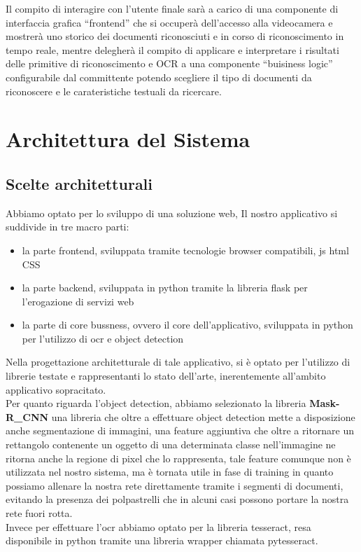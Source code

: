 \documentclass[12pt,a4paper]{article}
\newcommand{\mrcnn}{Mask-R\_CNN}
\begin{document}
Il compito di interagire con l'utente finale sarà a carico di una
componente di interfaccia grafica ``frontend'' che si occuperà
dell'accesso alla videocamera e mostrerà uno storico dei documenti
riconosciuti e in corso di riconoscimento in tempo reale, mentre
delegherà il compito di applicare e interpretare i risultati delle
primitive di riconoscimento e OCR a una componente ``buisiness logic''
configurabile dal committente potendo scegliere il tipo di documenti da
riconoscere e le carateristiche testuali da ricercare.

\section{Architettura del Sistema}

\subsection{Scelte architetturali}

Abbiamo optato per lo sviluppo di una soluzione web, Il nostro
applicativo si suddivide in tre macro parti:

\begin{itemize}
    \item la parte frontend, sviluppata tramite tecnologie browser
        compatibili, js html CSS
    \item la parte backend, sviluppata in python tramite la libreria
        flask per l'erogazione di servizi web
    \item la parte di core bussness, ovvero il core dell'applicativo,
        sviluppata in python per l'utilizzo di ocr e object
        detection
\end{itemize}

Nella progettazione architetturale di tale applicativo, si è optato per
l'utilizzo di librerie testate e rappresentanti lo stato dell'arte,
inerentemente all'ambito applicativo sopracitato.\\
Per quanto riguarda l'object detection, abbiamo selezionato la libreria
\textbf{\mrcnn} una libreria che oltre a effettuare object detection mette a
disposizione anche segmentazione di immagini, una feature aggiuntiva che
oltre a ritornare un rettangolo contenente un oggetto di una determinata
classe nell'immagine ne ritorna anche la regione di pixel che lo
rappresenta, tale feature comunque non è utilizzata nel nostro sistema,
ma è tornata utile in fase di training in quanto possiamo allenare la
nostra rete direttamente tramite i segmenti di documenti, evitando la
presenza dei polpastrelli che in alcuni casi possono portare la nostra
rete fuori rotta.\\
Invece per effettuare l'ocr abbiamo optato per la libreria tesseract,
resa disponibile in python tramite una libreria wrapper chiamata
pytesseract.
\end{document}
